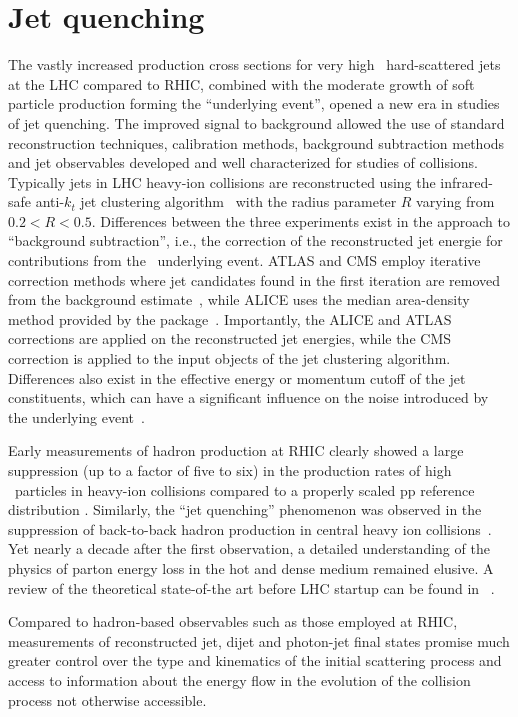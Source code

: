 \section{Jet quenching}
\label{jets_intro}

The vastly increased production cross sections for very high \pT\ hard-scattered jets at the LHC
compared to RHIC, combined with the moderate growth of soft particle production forming the ``underlying
event'', opened a new era in studies of jet quenching. The improved signal to background allowed the
use of standard reconstruction techniques, calibration methods, background subtraction methods and
jet observables developed and well characterized for studies of \pp collisions.
Typically jets in LHC heavy-ion collisions are reconstructed using
the infrared-safe anti-$k_t$ jet clustering algorithm~\cite{Cacciari:2008gp} with the
radius parameter $R$ varying from $0.2 < R  < 0.5$. Differences between the three
experiments exist in the approach to ``background subtraction'', i.e., the correction
of the reconstructed jet energie for contributions from the \PbPb\ underlying event. 
ATLAS and CMS employ iterative correction methods where jet candidates found in
the first iteration are removed from the background estimate~\cite{Kodolova:2007hd,Grau:2008ed},
while ALICE uses the median area-density method provided by the  package~\cite{Cacciari:2011ma}.
Importantly, the ALICE and ATLAS corrections are applied on the reconstructed jet energies,
while the CMS correction is applied to the input objects of the jet clustering algorithm.
Differences also exist in the effective energy or momentum cutoff of the jet constituents,
which can have a significant influence on the noise introduced by the underlying event~\cite{Abelev:2012ej}.

Early measurements of hadron production at RHIC
clearly showed a large suppression (up to a factor of five to six) in the production rates of
high \pT\ particles in heavy-ion collisions compared to a properly scaled pp reference distribution
\cite{Adcox:2001jp,Adler:2002xw}. Similarly, the ``jet quenching'' phenomenon was observed
in the suppression of back-to-back hadron production
in central heavy ion collisions~\cite{Adcox:2001jp,Adler:2002xw}. Yet nearly a decade after the first observation, a detailed
understanding of the physics of parton energy loss in the hot and dense medium remained
elusive. A review of the theoretical state-of-the art before LHC startup can be
found in ~\cite{Wiedemann:2009sh}.

Compared to hadron-based observables such as those employed at RHIC, measurements of reconstructed
jet, dijet and photon-jet final states promise much greater control over the type and kinematics
of the initial scattering process and access to information about the energy flow in the evolution
of the collision process not otherwise accessible.

